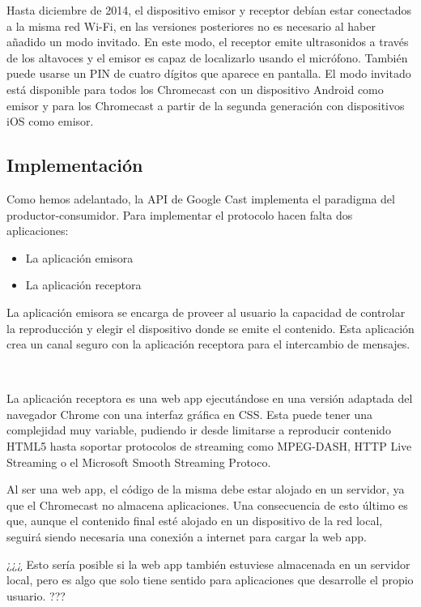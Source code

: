 Hasta diciembre de 2014, el dispositivo emisor y receptor debían estar conectados a la misma red Wi-Fi, en las versiones posteriores no es necesario al haber añadido un modo invitado.
En este modo, el receptor emite ultrasonidos a través de los altavoces y el emisor es capaz de localizarlo usando el micrófono.
También puede usarse un PIN de cuatro dígitos que aparece en pantalla.
El modo invitado está disponible para todos los Chromecast con un dispositivo Android como emisor y para los Chromecast a partir de la segunda generación con dispositivos iOS como emisor.


\subsection{Implementación}

Como hemos adelantado, la API de Google Cast implementa el paradigma del productor-consumidor. Para implementar el protocolo hacen falta dos aplicaciones:

\begin{itemize}
	\item La aplicación emisora 
	\item La aplicación receptora 
\end{itemize}
	La aplicación emisora se encarga de proveer al usuario la capacidad de controlar la reproducción y elegir el dispositivo donde se emite el contenido.
	Esta aplicación crea un canal seguro con la aplicación receptora para el intercambio de mensajes.

	\

	La aplicación receptora es una web app ejecutándose en una versión adaptada del navegador Chrome con una interfaz gráfica en CSS.
	Esta puede tener una complejidad muy variable, pudiendo ir desde limitarse a reproducir contenido HTML5 hasta soportar protocolos de streaming como MPEG-DASH, HTTP Live Streaming o el Microsoft Smooth Streaming Protoco\cite{CastSDK}.
	
	Al ser una web app, el código de la misma debe estar alojado en un servidor, ya que el Chromecast no almacena aplicaciones.
	Una consecuencia de esto último es que, aunque el contenido final esté alojado en un dispositivo de la red local, seguirá siendo necesaria una conexión a internet para cargar la web app. 
	
	¿¿¿ Esto sería posible si la web app también estuviese almacenada en un servidor local, pero es algo que solo tiene sentido para aplicaciones que desarrolle el propio usuario. ???


